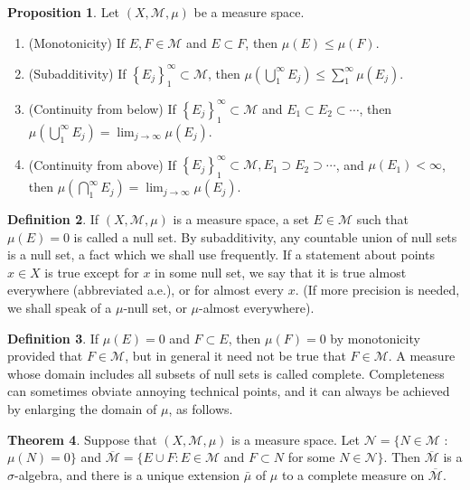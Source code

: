 \documentclass[12pt,a4paper]{book}
\newenvironment{enu}{\begin{enumerate}[(1)]}{\end{enumerate}}
\theoremstyle{definition}
\newtheorem{defn}{Definition}[section]
\newtheorem{theo}[defn]{Theorem}
\newtheorem{prop}[defn]{Proposition}
\begin{document}
\begin{prop}
    Let $(X, \mathcal{M}, \mu)$ be a measure space.
    \begin{enu}
        \item (Monotonicity) If $E, F \in \mathcal{M}$ and $E \subset F$, then $\mu(E) \leq \mu(F)$.
        \item (Subadditivity) If $\left\{E_j\right\}_1^{\infty} \subset \mathcal{M}$, then $\mu\left(\bigcup_1^{\infty} E_j\right) \leq \sum_1^{\infty} \mu\left(E_j\right)$.
        \item (Continuity from below) If $\left\{E_j\right\}_1^{\infty} \subset \mathcal{M}$ and $E_1 \subset E_2 \subset \cdots$, then $\mu\left(\bigcup_1^{\infty} E_j\right)=\lim _{j \rightarrow \infty} \mu\left(E_j\right)$.
        \item (Continuity from above) If $\left\{E_j\right\}_1^{\infty} \subset \mathcal{M}, E_1 \supset E_2 \supset \cdots$, and $\mu\left(E_1\right)<\infty$, then $\mu\left(\bigcap_1^{\infty} E_j\right)=\lim _{j \rightarrow \infty} \mu\left(E_j\right)$.
    \end{enu}
\end{prop}
\begin{defn}
    If $(X, \mathcal{M}, \mu)$ is a measure space,
    a set $E \in \mathcal{M}$ such that $\mu(E)=0$ is called a null set. By subadditivity,
    any countable union of null sets is a null set, a fact which we shall use frequently.
    If a statement about points $x \in X$ is true except for $x$ in some null set, we say that it is true almost
    everywhere (abbreviated a.e.), or for almost every $x$. (If more precision is needed,
    we shall speak of a $\mu$-null set, or $\mu$-almost everywhere).
\end{defn}
\begin{defn}
    If $\mu(E)=0$ and $F \subset E$, then $\mu(F)=0$ by monotonicity provided that $F \in \mathcal{M}$, but in general it need not be true that $F \in \mathcal{M}$. A measure whose domain includes all subsets of null sets is called complete. Completeness can sometimes obviate annoying technical points, and it can always be achieved by enlarging the domain of $\mu$, as follows.
\end{defn}
\begin{theo}
    Suppose that $(X, \mathcal{M}, \mu)$ is a measure space. Let $\mathcal{N}=\{N \in \mathcal{M}$ : $\mu(N)=0\}$ and $\overline{\mathcal{M}}=\{E \cup F: E \in \mathcal{M}$ and $F \subset N$ for some $N \in \mathcal{N}\}$. Then $\overline{\mathcal{M}}$ is a $\sigma$-algebra, and there is a unique extension $\bar{\mu}$ of $\mu$ to a complete measure on $\overline{\mathcal{M}}$.
\end{theo}
\end{document}
